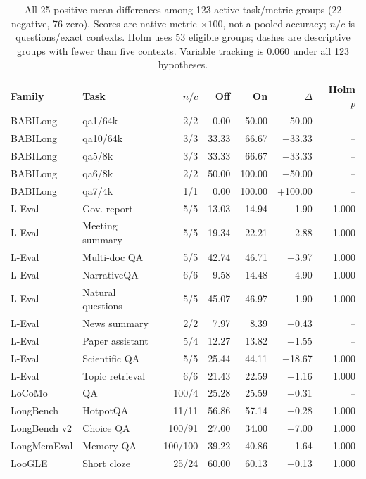 \begin{table}[H]
\centering
\footnotesize
\setlength{\tabcolsep}{4pt}
\caption{All 25 positive mean differences among 123 active task/metric groups (22 negative, 76 zero). Scores are native metric $\times100$, not a pooled accuracy; $n/c$ is questions/exact contexts. Holm uses 53 eligible groups; dashes are descriptive groups with fewer than five contexts. Variable tracking is 0.060 under all 123 hypotheses.}
\label{tab:sub-positive}
\begin{tabular}{llrrrrr}
\toprule
Family & Task & $n/c$ & Off & On & $\Delta$ & Holm $p$ \\
\midrule
BABILong & qa1/64k & 2/2 & 0.00 & 50.00 & +50.00 & -- \\
BABILong & qa10/64k & 3/3 & 33.33 & 66.67 & +33.33 & -- \\
BABILong & qa5/8k & 3/3 & 33.33 & 66.67 & +33.33 & -- \\
BABILong & qa6/8k & 2/2 & 50.00 & 100.00 & +50.00 & -- \\
BABILong & qa7/4k & 1/1 & 0.00 & 100.00 & +100.00 & -- \\
L-Eval & Gov. report & 5/5 & 13.03 & 14.94 & +1.90 & 1.000 \\
L-Eval & Meeting summary & 5/5 & 19.34 & 22.21 & +2.88 & 1.000 \\
L-Eval & Multi-doc QA & 5/5 & 42.74 & 46.71 & +3.97 & 1.000 \\
L-Eval & NarrativeQA & 6/6 & 9.58 & 14.48 & +4.90 & 1.000 \\
L-Eval & Natural questions & 5/5 & 45.07 & 46.97 & +1.90 & 1.000 \\
L-Eval & News summary & 2/2 & 7.97 & 8.39 & +0.43 & -- \\
L-Eval & Paper assistant & 5/4 & 12.27 & 13.82 & +1.55 & -- \\
L-Eval & Scientific QA & 5/5 & 25.44 & 44.11 & +18.67 & 1.000 \\
L-Eval & Topic retrieval & 6/6 & 21.43 & 22.59 & +1.16 & 1.000 \\
LoCoMo & QA & 100/4 & 25.28 & 25.59 & +0.31 & -- \\
LongBench & HotpotQA & 11/11 & 56.86 & 57.14 & +0.28 & 1.000 \\
LongBench v2 & Choice QA & 100/91 & 27.00 & 34.00 & +7.00 & 1.000 \\
LongMemEval & Memory QA & 100/100 & 39.22 & 40.86 & +1.64 & 1.000 \\
LooGLE & Short cloze & 25/24 & 60.00 & 60.13 & +0.13 & 1.000 \\

\end{tabular}
\end{table}
